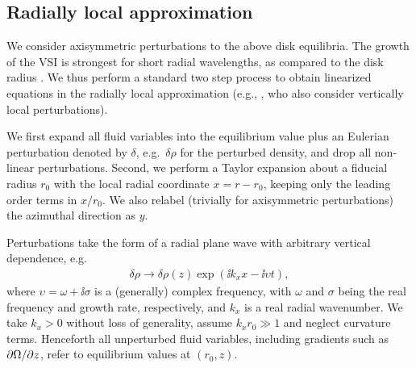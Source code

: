 \subsection{Radially local approximation}\label{sec:radlocal}
We consider axisymmetric perturbations to the above disk equilibria.    
The growth of the VSI is strongest for short radial wavelengths, as compared
 to the disk radius .  We thus perform a
 standard two step process to obtain linearized equations in the radially local 
 approximation (e.g., \citealp{goldreich67}, who also consider vertically local perturbations).  
 
 We first expand all fluid variables 
 into the equilibrium value plus an Eulerian perturbation denoted by $\delta$, e.g.\ 
 $\delta \rho$ for the perturbed density, and drop all non-linear perturbations.  Second, we perform
 a Taylor expansion about a fiducial radius $r_0$ with the local radial coordinate
 $x = r - r_0$, keeping only the leading order terms in $x/r_0$.  We also relabel 
 (trivially for axisymmetric perturbations) the azimuthal direction as $y$.  
 
 Perturbations take the form of a radial plane wave with arbitrary vertical dependence, 
 e.g.\
 \begin{align}
  \delta\rho \rightarrow \delta\rho(z)\exp{\left(\ii k_x x - \ii\upsilon
      t\right)},    
\end{align}
where $\upsilon = \omega + \ii \sigma$ is a (generally) complex frequency, 
with $\omega$ and $\sigma$ being
the real frequency and growth rate, respectively, and $k_x$ is a real 
radial wavenumber.  We take $k_x>0$ without loss of generality, 
assume $k_xr_0 \gg 1$ and neglect curvature terms. 
Henceforth all unperturbed fluid variables, including 
gradients such as $\partial \Omega/ \partial z$, refer to  equilibrium values at $(r_0, z)$.


